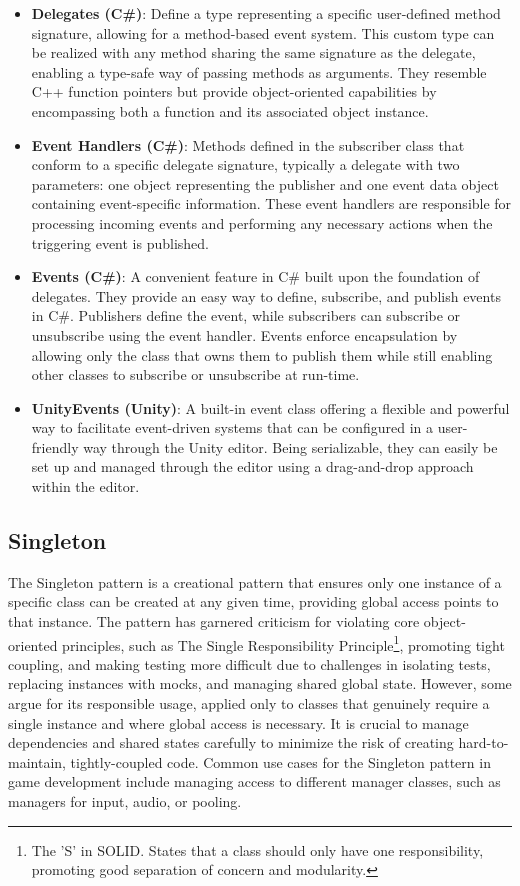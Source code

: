 \begin{itemize}
    \item \textbf{Delegates (C\#)}: Define a type representing a specific user-defined method signature, allowing for a method-based event system. This custom type can be realized with any method sharing the same signature as the delegate, enabling a type-safe way of passing methods as arguments. They resemble C++ function pointers but provide object-oriented capabilities by encompassing both a function and its associated object instance.
    
    \item \textbf{Event Handlers (C\#)}: Methods defined in the subscriber class that conform to a specific delegate signature, typically a delegate with two parameters: one object representing the publisher and one event data object containing event-specific information. These event handlers are responsible for processing incoming events and performing any necessary actions when the triggering event is published.
    
    \item \textbf{Events (C\#)}: A convenient feature in C\# built upon the foundation of delegates. They provide an easy way to define, subscribe, and publish events in C\#. Publishers define the event, while subscribers can subscribe or unsubscribe using the event handler. Events enforce encapsulation by allowing only the class that owns them to publish them while still enabling other classes to subscribe or unsubscribe at run-time.
    
    \item \textbf{UnityEvents (Unity)}: A built-in event class offering a flexible and powerful way to facilitate event-driven systems that can be configured in a user-friendly way through the Unity editor. Being serializable, they can easily be set up and managed through the editor using a drag-and-drop approach within the editor.
\end{itemize}

\subsection{Singleton}
    The Singleton pattern is a creational pattern that ensures only one instance of a specific class can be created at any given time, providing global access points to that instance. The pattern has garnered criticism for violating core object-oriented principles, such as The Single Responsibility Principle\footnote{The 'S' in SOLID. States that a class should only have one responsibility, promoting good separation of concern and modularity.}, promoting tight coupling, and making testing more difficult due to challenges in isolating tests, replacing instances with mocks, and managing shared global state. However, some argue for its responsible usage, applied only to classes that genuinely require a single instance and where global access is necessary. It is crucial to manage dependencies and shared states carefully to minimize the risk of creating hard-to-maintain, tightly-coupled code. Common use cases for the Singleton pattern in game development include managing access to different manager classes, such as managers for input, audio, or pooling.

